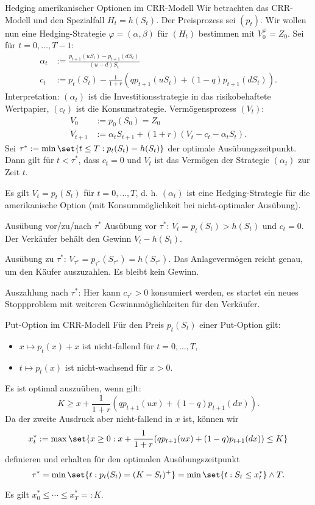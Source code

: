 \begin{karte}{Hedging amerikanischer Optionen im CRR-Modell}
Wir betrachten das CRR-Modell und den Spezialfall \(H_t = h(S_t)\).
Der Preisprozess sei \((p_t)\).
Wir wollen nun eine Hedging-Strategie \(\varphi = (\alpha, \beta)\) für \((H_t)\) 
bestimmen mit \(V_0^\varphi = Z_0\). Sei für \(t=0,\ldots, T-1\): 
\begin{align*}
    \alpha_t &:= \frac{p_{t+1}(uS_t) - p_{t+1}(d S_t)}{(u-d)S_t} \\
    c_t &:= p_t(S_t) - \frac{1}{1+r} (q p_{t+1} ( u S_t) + (1-q) p_{t+1}(d S_t)).
\end{align*}
Interpretation: \((\alpha_t)\) ist die Investitionsstrategie in das risikobehaftete Wertpapier, 
\((c_t)\) ist die Konsumstrategie. 
Vermögensprozess \((V_t)\): 
\begin{align*}
    V_0 &:= p_0 (S_0) = Z_0 \\
    V_{t+1} &:= \alpha_t S_{t+1} + (1+r) ( V_t - c_t - \alpha_t S_t).
\end{align*}
Sei \(\tau^* := \min\set{t\leq T: p_t(S_t) = h(S_t)}\) der optimale Ausübungszeitpunkt. 
Dann gilt für \(t < \tau^*\), dass \(c_t = 0\) und \(V_t\) ist das Vermögen der Strategie \((\alpha_t)\) 
zur Zeit \(t\).

Es gilt \(V_t = p_t(S_t)\) für \(t=0,\ldots, T\), d. h. \((\alpha_t)\) ist eine 
Hedging-Strategie für die amerikanische Option (mit Konsummöglichkeit bei nicht-optimaler Ausübung).
\end{karte}

\begin{karte}{Ausübung vor/zu/nach \(\tau^*\)}
Ausübung vor \(\tau^*\): \(V_t = p_t(S_t) > h(S_t)\) und \(c_t = 0\). 
Der Verkäufer behält den Gewinn \(V_t - h(S_t)\).

Ausübung zu \(\tau^*\): \(V_{\tau^*} = p_{\tau^*}(S_{\tau^*}) = h(S_{\tau^*})\).
Das Anlagevermögen reicht genau, um den Käufer auszuzahlen. Es bleibt kein Gewinn.

Auszahlung nach \(\tau^*\): Hier kann \(c_{\tau^*} > 0\) konsumiert werden, es startet 
ein neues Stoppproblem mit weiteren Gewinnmöglichkeiten für den Verkäufer.
\end{karte}

\begin{karte}{Put-Option im CRR-Modell}
Für den Preis \(p_t(S_t)\) einer Put-Option gilt: 
\begin{itemize}
    \item \(x\mapsto p_t(x) + x\) ist nicht-fallend für \(t=0,\ldots, T\), 
    \item \(t\mapsto p_t(x)\) ist nicht-wachsend für \(x>0\).
\end{itemize}

Es ist optimal auszuüben, wenn gilt: 
\[ K \geq x + \frac{1}{1+r}(q p_{t+1}(ux) + (1-q)p_{t+1}(dx)). \]
Da der zweite Ausdruck aber nicht-fallend in \(x\) ist, können wir 
\[ x_t^* := \max\set{ x \geq 0: x + \frac{1}{1+r}(q p_{t+1}(ux) + (1-q)p_{t+1}(dx)) \leq K } \]
definieren und erhalten für den optimalen Ausübungszeitpunkt 
\[ \tau^* = \min\set{ t : p_t(S_t) = (K-S_t)^+ } = \min \set{ t: S_t \leq x_t^* } \wedge T. \]

Es gilt \(x_0^* \leq \cdots \leq x_T^* =: K\).
\end{karte}